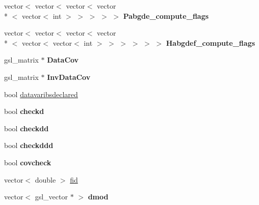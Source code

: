 \begin{DoxyCompactItemize}
\item 
\hypertarget{classDaliBase_ae861877710efbfc385397ad6b5deffa4}{vector$<$ vector$<$ vector$<$ vector\\*
$<$ vector$<$ int $>$ $>$ $>$ $>$ $>$ {\bfseries Pabgde\-\_\-compute\-\_\-flags}}\label{classDaliBase_ae861877710efbfc385397ad6b5deffa4}

\item 
\hypertarget{classDaliBase_a020d41ac3e343416350cfbf913c2553d}{vector$<$ vector$<$ vector$<$ vector\\*
$<$ vector$<$ vector$<$ int $>$ $>$ $>$ $>$ $>$ $>$ {\bfseries Habgdef\-\_\-compute\-\_\-flags}}\label{classDaliBase_a020d41ac3e343416350cfbf913c2553d}

\item 
\hypertarget{classDaliBase_a0d7bf539463c26a4dccb73f4c5839a12}{gsl\-\_\-matrix $\ast$ {\bfseries Data\-Cov}}\label{classDaliBase_a0d7bf539463c26a4dccb73f4c5839a12}

\item 
\hypertarget{classDaliBase_a7fd3532925487a8a6d9b5d2b00348b18}{gsl\-\_\-matrix $\ast$ {\bfseries Inv\-Data\-Cov}}\label{classDaliBase_a7fd3532925487a8a6d9b5d2b00348b18}

\item 
bool \hyperlink{classDaliBase_ac19be40e90cba3bdf8fc6a132b3d955d}{datavaribsdeclared}
\item 
\hypertarget{classDaliBase_a10faed76b3954280b83ff927d176acad}{bool {\bfseries checkd}}\label{classDaliBase_a10faed76b3954280b83ff927d176acad}

\item 
\hypertarget{classDaliBase_a3b9da5a51df20cdad2f8b8b7d707eb75}{bool {\bfseries checkdd}}\label{classDaliBase_a3b9da5a51df20cdad2f8b8b7d707eb75}

\item 
\hypertarget{classDaliBase_a6a36213fa6a2f994897540222aee0c41}{bool {\bfseries checkddd}}\label{classDaliBase_a6a36213fa6a2f994897540222aee0c41}

\item 
\hypertarget{classDaliBase_ad4bf365b7b5292a9ee12cceb2c4743a8}{bool {\bfseries covcheck}}\label{classDaliBase_ad4bf365b7b5292a9ee12cceb2c4743a8}

\item 
vector$<$ double $>$ \hyperlink{classDaliBase_ab132077315b2aadc9368a29baec1c8f0}{fid}
\item 
\hypertarget{classDaliBase_a5169cd6353fdccdad05f459ba72efee0}{vector$<$ gsl\-\_\-vector $\ast$ $>$ {\bfseries dmod}}\label{classDaliBase_a5169cd6353fdccdad05f459ba72efee0}


\end{DoxyCompactItemize}
